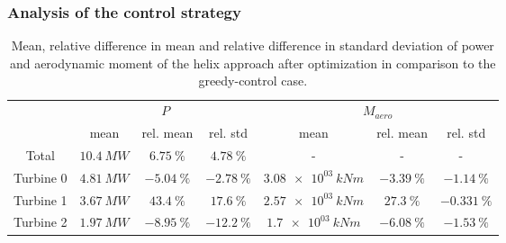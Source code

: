 \subsubsection{Analysis of the control strategy}
\begin{table}[h]
	\centering
	\caption{Mean, relative difference in mean and relative difference in standard deviation of power and aerodynamic moment of the helix approach after optimization in comparison to the greedy-control case.}
	\begin{tabular}{ccccccc}
	\toprule
	& \multicolumn{3}{c}{$P$}  & \multicolumn{3}{c}{$M_{aero}$ }\\ \cmidrule(rl){2-4} \cmidrule(rl){5-7}
	& mean & rel. mean & rel. std  & mean & rel. mean & rel. std \\ \midrule
	Total & $\SI{  10.4}{MW} $ & $\SI{ +6.75}{\%}$ & $\SI{ +4.78}{\%}$ &-&-&- \
	\\
	Turbine 0  & $\SI{  4.81}{MW} $ & $\SI{ -5.04}{\%}$ & $\SI{ -2.78}{\%}$ & $\SI{3.08e03}{kNm} $ & $\SI{ -3.39}{\%}$ & $\SI{ -1.14}{\%}$ \\
	Turbine 1  & $\SI{  3.67}{MW} $ & $\SI{ +43.4}{\%}$ & $\SI{ +17.6}{\%}$ & $\SI{2.57e03}{kNm} $ & $\SI{ +27.3}{\%}$ & $\SI{-0.331}{\%}$ \\
	Turbine 2  & $\SI{  1.97}{MW} $ & $\SI{ -8.95}{\%}$ & $\SI{ -12.2}{\%}$ & $\SI{1.7e03}{kNm} $ & $\SI{ -6.08}{\%}$ & $\SI{ -1.53}{\%}$ \\
	\bottomrule
	\end{tabular}
	\label{tab:dipc_big_quants}
\end{table}
